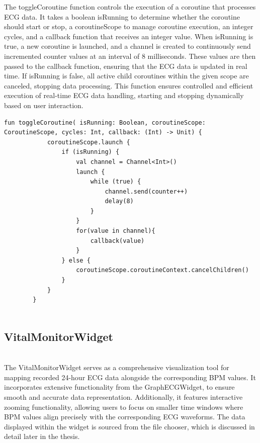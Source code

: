 {{\begin{lstlisting}[label={fig:simpleSourceGen.cs}, caption={Code to toggle drawing per user input}]
	\end{lstlisting}
	The toggleCoroutine function controls the execution of a coroutine that processes ECG data. It takes a boolean isRunning to determine whether the coroutine should start or stop, a coroutineScope to manage coroutine execution, an integer cycles, and a callback function that receives an integer value. When isRunning is true, a new coroutine is launched, and a channel is created to continuously send incremented counter values at an interval of 8 milliseconds. These values are then passed to the callback function, ensuring that the ECG data is updated in real time. If isRunning is false, all active child coroutines within the given scope are canceled, stopping data processing. This function ensures controlled and efficient execution of real-time ECG data handling, starting and stopping dynamically based on user interaction.
		\begin{lstlisting}[label={fig:simpleSourceGen.cs}, caption={Code to start/stop the drawing routine}]
		fun toggleCoroutine( isRunning: Boolean, coroutineScope: CoroutineScope, cycles: Int, callback: (Int) -> Unit) {
			coroutineScope.launch {
				if (isRunning) {
					val channel = Channel<Int>()
					launch {
						while (true) {
							channel.send(counter++)
							delay(8)
						}
					}
					for(value in channel){
						callback(value)
					}
				} else {
					coroutineScope.coroutineContext.cancelChildren()
				}
			}
		}
		
	\end{lstlisting}
	\subsection{VitalMonitorWidget}
	\mbox{}\\
	The VitalMonitorWidget serves as a comprehensive visualization tool for mapping recorded 24-hour ECG data alongside the corresponding BPM values. It incorporates extensive functionality from the GraphECGWidget, to ensure smooth and accurate data representation. Additionally, it features interactive zooming functionality, allowing users to focus on smaller time windows where BPM values align precisely with the corresponding ECG waveforms. The data displayed within the widget is sourced from the file chooser, which is discussed in detail later in the thesis.
}}
